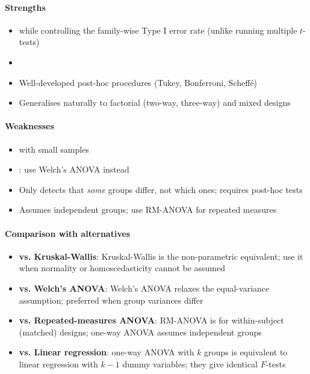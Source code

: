 \paragraph{Strengths}
\begin{itemize}
    \item {} while controlling the family-wise
        Type I error rate (unlike running multiple $t$-tests)
    \item {}
    \item Well-developed post-hoc procedures (Tukey, Bonferroni, Scheffé)
    \item Generalises naturally to factorial (two-way, three-way) and mixed designs
\end{itemize}

\paragraph{Weaknesses}
\begin{itemize}
    \item {} with small samples
    \item {}: use Welch's ANOVA instead
    \item Only detects that \emph{some} groups differ, not which ones; requires post-hoc
        tests
    \item Assumes independent groups; use RM-ANOVA for repeated measures
\end{itemize}

\paragraph{Comparison with alternatives}
\begin{itemize}
    \item \textbf{vs. Kruskal-Wallis}: Kruskal-Wallis is the non-parametric equivalent;
        use it when normality or homoscedasticity cannot be assumed
    \item \textbf{vs. Welch's ANOVA}: Welch's ANOVA relaxes the equal-variance assumption;
        preferred when group variances differ
    \item \textbf{vs. Repeated-measures ANOVA}: RM-ANOVA is for within-subject (matched)
        designs; one-way ANOVA assumes independent groups
    \item \textbf{vs. Linear regression}: one-way ANOVA with $k$ groups is equivalent to
        linear regression with $k-1$ dummy variables; they give identical $F$-tests
\end{itemize}

